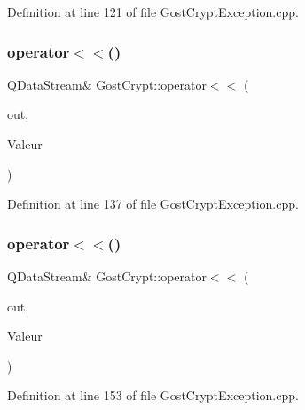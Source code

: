 Definition at line 121 of file Gost\+Crypt\+Exception.\+cpp.

\mbox{\label{namespace_gost_crypt_a752b69aa35f9eb0bdc04c6cd3f8442d1}} 
\subsubsection{\texorpdfstring{operator$<$$<$()}{operator<<()}\hspace{0.1cm}{\footnotesize\ttfamily [8/13]}}
{\footnotesize\ttfamily Q\+Data\+Stream\& Gost\+Crypt\+::operator$<$$<$ (\begin{DoxyParamCaption}\item[{Q\+Data\+Stream \&}]{out,  }\item[{const \hyperlink{class_gost_crypt_1_1_failed_read_file}{Gost\+Crypt\+::\+Failed\+Read\+File} \&}]{Valeur }\end{DoxyParamCaption})}



Definition at line 137 of file Gost\+Crypt\+Exception.\+cpp.

\mbox{\label{namespace_gost_crypt_aa79dec7c3603a9ca936bd927e7b7d908}} 
\subsubsection{\texorpdfstring{operator$<$$<$()}{operator<<()}\hspace{0.1cm}{\footnotesize\ttfamily [9/13]}}
{\footnotesize\ttfamily Q\+Data\+Stream\& Gost\+Crypt\+::operator$<$$<$ (\begin{DoxyParamCaption}\item[{Q\+Data\+Stream \&}]{out,  }\item[{const \hyperlink{class_gost_crypt_1_1_failed_create_directory}{Gost\+Crypt\+::\+Failed\+Create\+Directory} \&}]{Valeur }\end{DoxyParamCaption})}



Definition at line 153 of file Gost\+Crypt\+Exception.\+cpp.

\mbox{\label{namespace_gost_crypt_a2f0aae264a4c81f5e7455d8fc2a8da1e}} 
